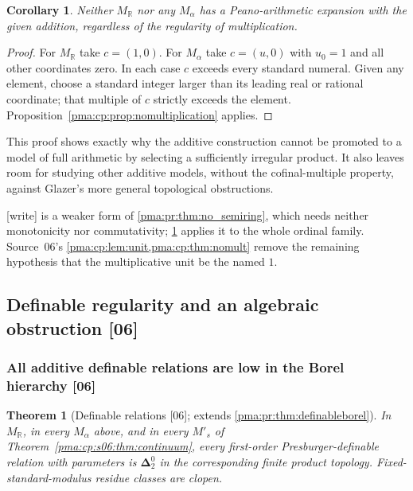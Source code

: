 \documentclass[11pt]{article}
\numberwithin{equation}{section}
\newtheorem{theorem}{Theorem}[section]
\newtheorem{corollary}[corollary]{Corollary}
\theoremstyle{definition}
\theoremstyle{remark}
\newcommand{\R}{\mathbb R}
\newcommand{\src}[1]{\textup{\textsf{\small[#1]}}}
\newcommand{\writetag}{\textup{\textsf{\small[write]}}}
\begin{document}
\begin{corollary}
\label{pma:cp:cor:noPA}
Neither $M_{\R}$ nor any $M_\alpha$ has a Peano-arithmetic expansion
with the given addition, regardless of the regularity of multiplication.
\end{corollary}

\begin{proof}
For $M_{\R}$ take $c=(1,0)$. For $M_\alpha$ take $c=(u,0)$ with
$u_0=1$ and all other coordinates zero. In each case $c$ exceeds every
standard numeral. Given any element, choose a standard integer larger
than its leading real or rational coordinate; that multiple of $c$
strictly exceeds the element. Proposition~\ref{pma:cp:prop:nomultiplication}
applies.
\end{proof}

This proof shows exactly why the additive construction cannot be promoted
to a model of full arithmetic by selecting a sufficiently irregular
product. It also leaves room for studying other additive models, without
the cofinal-multiple property, against Glazer's more general topological
obstructions.

\noindent\writetag{}  is a weaker form of
\cref{pma:pr:thm:no_semiring}, which needs neither monotonicity nor
commutativity; \cref{pma:cp:cor:noPA} applies it to the whole ordinal family.
Source~06's \cref{pma:cp:lem:unit,pma:cp:thm:nomult} remove the remaining
hypothesis that the multiplicative unit be the named $1$.

\subsection{Definable regularity and an algebraic obstruction \src{06}}
\label{pma:cp:sec:regularity}

\subsubsection{All additive definable relations are low in the Borel hierarchy \src{06}}

\begin{theorem}[Definable relations \src{06}; extends \cref{pma:pr:thm:definableborel}]
\label{pma:cp:thm:delta2}
In $M_{\R}$, in every $M_\alpha$ above, and in every $M'_s$ of
Theorem~\ref{pma:cp:s06:thm:continuum}, every first-order Presburger-definable
relation with parameters is $\boldsymbol\Delta^0_2$ in the corresponding
finite product topology. Fixed-standard-modulus residue classes are
clopen.
\end{theorem}
\end{document}
